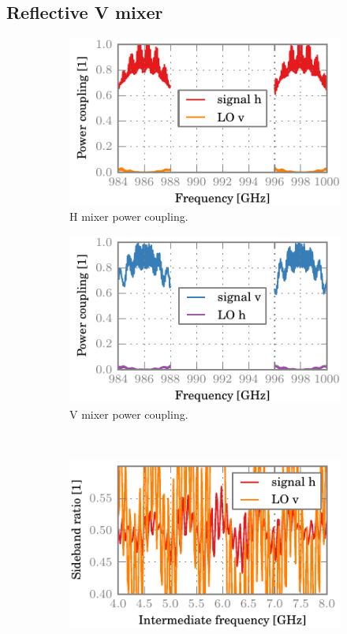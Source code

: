 \clearpage
\subsection{Reflective V mixer}
\begin{figure}[hbtp]
    \centering
    \begin{subfigure}[b]{.5\textwidth}
        \includegraphics{chapter_3/15_everything_h_dsb}%
        \caption{H mixer power coupling.}
    \end{subfigure}%
    \begin{subfigure}[b]{.5\textwidth}
        \includegraphics{chapter_3/15_everything_v_dsb}%
        \caption{V mixer power coupling.}
    \end{subfigure}%
    \\
    \begin{subfigure}[b]{.5\textwidth}
        \includegraphics{chapter_3/15_everything_h_sbr}%

\end{subfigure}
\end{figure}
